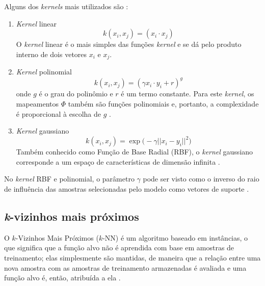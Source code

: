 Alguns dos \emph{kernels} mais utilizados são \citep{lorena:03}:
\begin{enumerate}[label=(\roman*)]
\item \emph{Kernel} linear
\begin{equation}
\label{eq:svm_kernel_linear}
k(x_i, x_j) =  (x_i \cdot x_j)
\end{equation}
O \emph{kernel} linear é o mais simples das funções \emph{kernel} e se dá pelo produto interno de dois vetores $x_i$ e $x_j$.

\item \emph{Kernel} polinomial
\begin{equation}
\label{eq:svm_kernel_polinomial}
k(x_i, x_j) =  ({\gamma x_i \cdot y_i + r} )^g
\end{equation}
\noindent onde $g$ é o grau do polinômio e $r$ é um termo constante. Para este \emph{kernel}, os mapeamentos $\Phi$ também são funções polinomiais e, portanto, a complexidade é proporcional à escolha de $g$ \citep{lorena:03}.

\item \emph{Kernel} gaussiano
\begin{equation}
\label{eq:svm_kernel_rbf}
k(x_i, x_j) =  \exp{\big(-\gamma {||x_i - y_i||}^2 \big)}
\end{equation}
Também conhecido como Função de Base Radial (RBF), o \emph{kernel} gaussiano corresponde a um espaço de características de dimensão infinita \citep{lorena:03}.
\end{enumerate}

No \emph{kernel} RBF e polinomial, o parâmetro $\gamma$ pode ser visto como o inverso do raio de influência das amostras selecionadas pelo modelo como vetores de suporte \citep{scikit-learn:11}.

\subsection{\emph{k}-vizinhos mais próximos}
\label{sec:clasificadores_knn}
O $k$-Vizinhos Mais Próximos ($k$-NN) é um algoritmo baseado em instâncias, o que significa que a função alvo não é aprendida com base em amostras de treinamento; elas simplesmente são mantidas, de maneira que a relação entre uma nova amostra com as amostras de treinamento armazenadas é avaliada e uma função alvo é, então, atribuída a ela \citep{mitchell:97}.


